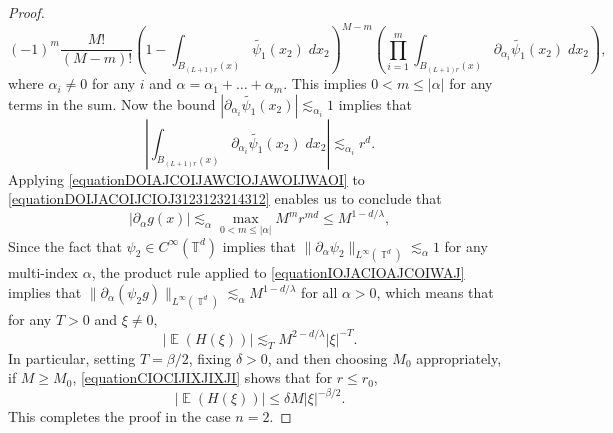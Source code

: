\documentclass[dvipsnames,letterpaper,12pt]{article}
\numberwithin{equation}{section}
\DeclareMathOperator{\TT}{\mathbb{T}}
\numberwithin{theorem}{section}
\DeclareMathOperator{\EE}{\mathbb{E}}
\begin{document}
\begin{proof}
\begin{equation}
        (-1)^m \frac{M!}{(M-m)!} \left( 1 - \int_{B_{(L+1) r}(x)} \tilde{\psi_1}(x_2)\; dx_2 \right)^{M-m} \left( \prod_{i = 1}^{m} \int_{B_{(L+1)r}(x)} \partial_{\alpha_i} \tilde{\psi_1}(x_2)\; dx_2 \right),
    \end{equation}
    where $\alpha_i \neq 0$ for any $i$ and $\alpha = \alpha_1 + \dots + \alpha_m$. This implies $0 < m \leq |\alpha|$ for any terms in the sum. Now the bound $|\partial_{\alpha_i} \tilde{\psi_1}(x_2)| \lesssim_{\alpha_i} 1$ implies that
    \begin{equation} \label{equationDOIAJCOIJAWCIOJAWOIJWAOI}
        \left| \int_{B_{(L+1)r}(x)} \partial_{\alpha_i} \tilde{\psi_1}(x_2)\; dx_2 \right| \lesssim_{\alpha_i} r^d.
    \end{equation}
    Applying \eqref{equationDOIAJCOIJAWCIOJAWOIJWAOI} to \eqref{equationDOIJACOIJCIOJ3123123214312} enables us to conclude that
    \begin{equation} \label{equationIOJACIOAJCOIWAJ}
        |\partial_\alpha g(x)| \lesssim_\alpha \max_{0 < m \leq |\alpha|} M^m r^{md} \leq M^{1 - d/\lambda},
    \end{equation}
    Since the fact that $\psi_2 \in C^\infty(\mathbb{T}^d)$ implies that $\| \partial_\alpha \psi_2 \|_{L^\infty(\TT^d)} \lesssim_\alpha 1$ for any multi-index $\alpha$, the product rule applied to \eqref{equationIOJACIOAJCOIWAJ} implies that $\| \partial_\alpha (\psi_2 g) \|_{L^\infty(\TT^d)} \lesssim_\alpha M^{1 - d/\lambda}$ for all $\alpha > 0$, which means that for any $T > 0$ and $\xi \neq 0$,
    \begin{equation} \label{equationCIOCIJIXJIXJI}
        |\EE(H(\xi))| \lesssim_T M^{2 - d/\lambda} |\xi|^{-T}.
    \end{equation}
    In particular, setting $T = \beta/2$, fixing $\delta > 0$, and then choosing $M_0$ appropriately, if $M \geq M_0$, \eqref{equationCIOCIJIXJIXJI} shows that for $r \leq r_0$,
    \begin{equation}
        |\EE(H(\xi))| \leq \delta M |\xi|^{-\beta/2}.
    \end{equation}
    This completes the proof in the case $n = 2$.


\end{proof}
\end{document}
